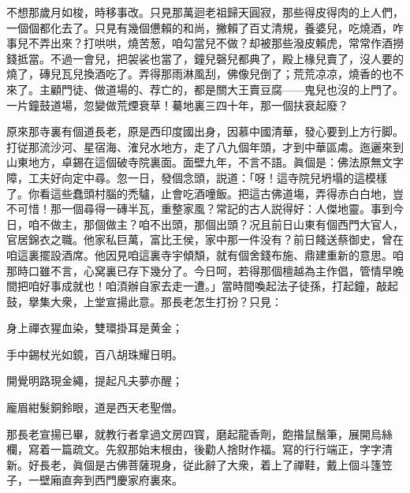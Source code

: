 不想那歲月如梭，時移事改。只見那萬迴老祖歸天圓寂，那些得皮得肉的上人們，一個個都化去了。只見有幾個憊賴的和尚，撇賴了百丈清規，養婆兒，吃燒酒，咋事兒不弄出來？打哄哄，燒苦葱，咱勾當兒不做？却被那些潑皮賴虎，常常作酒撈錢抵當。不過一會兒，把袈裟也當了，鐘兒磬兒都典了，殿上椽兒賣了，沒人要的燒了，磚兒瓦兒換酒吃了。弄得那雨淋風刮，佛像兒倒了；荒荒凉凉，燒香的也不來了。主顧門徒、做道場的、荐亡的，都是關大王賣豆腐——鬼兒也沒的上門了。一片鐘鼓道場，忽變做荒煙衰草！驀地裏三四十年，那一個扶衰起廢？

原來那寺裏有個道長老，原是西印度國出身，因慕中國清華，發心要到上方行脚。打従那流沙河、星宿海、㴶兒水地方，走了八九個年頭，才到中華區䖏。迤邐來到山東地方，卓錫在這個破寺院裏面。面壁九年，不言不語。眞個是：佛法原無文字障，工夫好向定中尋。忽一日，發個念頭，説道：「呀！這寺院兒坍塌的這模樣了。你看這些蠢頭村腦的禿驢，止會吃酒噇飯。把這古佛道塲，弄得赤白白地，豈不可惜！那一個尋得一磚半瓦，重整家風？常記的古人説得好：人傑地靈。事到今日，咱不做主，那個做主？咱不出頭，那個出頭？况且前日山東有個西門大官人，官居錦衣之職。他家私巨萬，富比王侯，家中那一件没有？前日餞送蔡御史，曾在咱這裏擺設酒席。他因見咱這裏寺宇傾頽，就有個舍錢布施、鼎建重新的意思。咱那時口雖不言，心窝裏已存下幾分了。今日呵，若得那個檀越為主作倡，管情早晚間把咱好事成就也！咱湏辦自家去走一遭。」當時間喚起法子徒孫，打起鐘，敲起鼓，擧集大衆，上堂宣揚此意。那長老怎生打扮？只見：

\begin{myquote}
身上禪衣猩血染，雙環掛耳是黄金；

手中錫杖光如鏡，百八胡珠耀日明。

開覺明路現金繩，提起凡夫夢亦醒；

龐眉紺髮銅鈴眼，道是西天老聖僧。
\end{myquote}

那長老宣揚已畢，就教行者拿過文房四寳，磨起龍香劑，飽揝鼠鬚筆，展開烏絲欄，寫着一篇疏文。先叙那始末根由，後勸人捨財作福。寫的行行端正，字字清新。好長老，眞個是古佛菩薩現身，従此辭了大衆，着上了禪鞋，戴上個斗篷笠子，一壁廂直奔到西門慶家府裏來。

